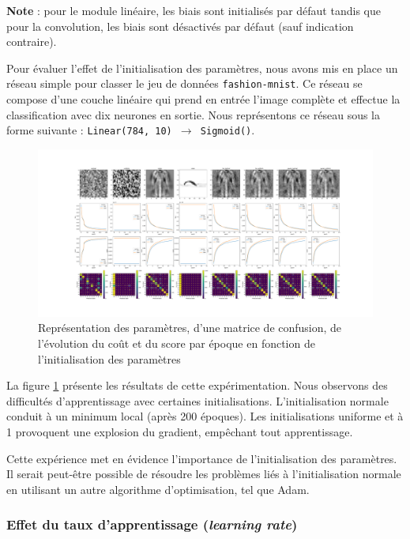 \documentclass{article}
\begin{document}
\textbf{Note} : pour le module linéaire, les biais sont initialisés par défaut tandis que pour la convolution, les biais sont désactivés par défaut (sauf indication contraire).

Pour évaluer l'effet de l'initialisation des paramètres, nous avons mis en place un réseau simple pour classer le jeu de données \texttt{fashion-mnist}. Ce réseau se compose d'une couche linéaire qui prend en entrée l'image complète et effectue la classification avec dix neurones en sortie. Nous représentons ce réseau sous la forme suivante : \texttt{Linear(784, 10) $ \rightarrow $ Sigmoid()}.

\begin{figure}[htbp]
    \centering
    \includegraphics[width=\textwidth]{init_type.pdf}
    \caption{Représentation des paramètres, d'une matrice de confusion, de l'évolution du coût et du score par époque en fonction de l'initialisation des paramètres}
    \label{fig:initparam}
\end{figure}

La figure \ref{fig:initparam} présente les résultats de cette expérimentation. Nous observons des difficultés d'apprentissage avec certaines initialisations. L'initialisation normale conduit à un minimum local (après 200 époques). Les initialisations uniforme et à 1 provoquent une explosion du gradient, empêchant tout apprentissage.

Cette expérience met en évidence l'importance de l'initialisation des paramètres. Il serait peut-être possible de résoudre les problèmes liés à l'initialisation normale en utilisant un autre algorithme d'optimisation, tel que Adam.

\subsubsection{Effet du taux d'apprentissage (\textit{learning rate})}
\end{document}
